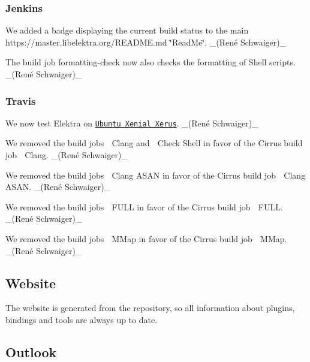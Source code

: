 \subsubsection*{Jenkins}


\begin{DoxyItemize}
\item We added a badge displaying the current build status to the main https\+://master.libelektra.\+org/\+R\+E\+A\+D\+ME.md \char`\"{}\+Read\+Me\char`\"{}. \+\_\+(René Schwaiger)\+\_\+
\item The build job {\ttfamily formatting-\/check} now also checks the formatting of Shell scripts. \+\_\+(René Schwaiger)\+\_\+
\end{DoxyItemize}

\subsubsection*{Travis}


\begin{DoxyItemize}
\item We now test Elektra on \href{https://docs.travis-ci.com/user/reference/xenial}{\tt Ubuntu Xenial Xerus}. \+\_\+(René Schwaiger)\+\_\+
\item We removed the build jobs {\ttfamily 🍏 Clang} and {\ttfamily 🍏 Check Shell} in favor of the Cirrus build job {\ttfamily 🍎 Clang}. \+\_\+(René Schwaiger)\+\_\+
\item We removed the build jobs {\ttfamily 🍏 Clang A\+S\+AN} in favor of the Cirrus build job {\ttfamily 🍎 Clang A\+S\+AN}. \+\_\+(René Schwaiger)\+\_\+
\item We removed the build jobs {\ttfamily 🍏 F\+U\+LL} in favor of the Cirrus build job {\ttfamily 🍎 F\+U\+LL}. \+\_\+(René Schwaiger)\+\_\+
\item We removed the build jobs {\ttfamily 🍏 M\+Map} in favor of the Cirrus build job {\ttfamily 🍎 M\+Map}. \+\_\+(René Schwaiger)\+\_\+
\end{DoxyItemize}

\subsection*{Website}

The website is generated from the repository, so all information about plugins, bindings and tools are always up to date.

\subsection*{Outlook}

